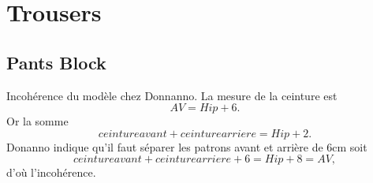 \documentclass[11pt,a4paper]{report}
\begin{document}
\chapter{Trousers}


\section{Pants Block}

Incohérence du modèle chez Donnanno. La mesure de la ceinture est
$$AV = Hip + 6.$$
Or la somme
$$ceinture avant + ceinture arriere = Hip +2.$$
Donanno indique qu'il faut séparer les patrons avant et arrière de 6cm soit
$$ceinture avant + ceinture arriere + 6 = Hip +8 = AV,$$
d'où l'incohérence.




\end{document}
